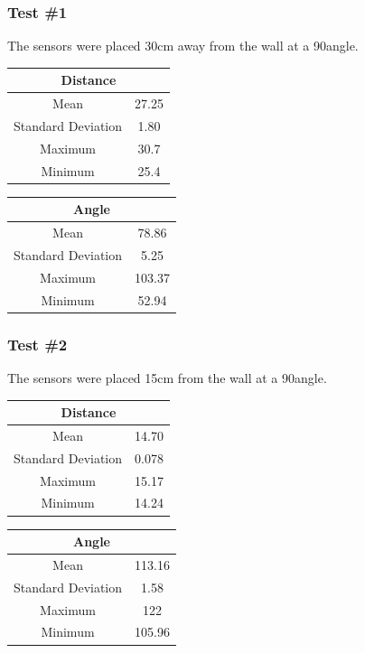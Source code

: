 \documentclass[12pt]{report}
\begin{document}
\subsubsection{Test \#1}
The sensors were placed 30cm away from the wall at a 90\textdegree angle.
\begin{center}
\begin{tabular}{ |c|c| } 
\hline
\multicolumn{2}{|c|}{Distance}\\
\hline
 Mean & 27.25 \\ 
 Standard Deviation & 1.80\\
 Maximum & 30.7\\
 Minimum & 25.4\\
 \hline
\end{tabular}
\quad
\begin{tabular}{ |c|c| } 
\hline
\multicolumn{2}{|c|}{Angle}\\
\hline
 Mean & 78.86 \\ 
 Standard Deviation & 5.25\\
 Maximum & 103.37\\
 Minimum & 52.94\\
 \hline
\end{tabular}
\end{center}

\subsubsection{Test \#2}
The sensors were placed 15cm from the wall at a 90\textdegree angle.
\begin{center}
\begin{tabular}{ |c|c| } 
\hline
\multicolumn{2}{|c|}{Distance}\\
\hline
 Mean & 14.70 \\ 
 Standard Deviation & 0.078\\
 Maximum & 15.17\\
 Minimum & 14.24\\
 \hline
\end{tabular}
\quad
\begin{tabular}{ |c|c| } 
\hline
\multicolumn{2}{|c|}{Angle}\\
\hline
 Mean & 113.16 \\ 
 Standard Deviation & 1.58\\
 Maximum & 122\\
 Minimum & 105.96\\
 \hline
\end{tabular}
\end{center}
\end{document}
